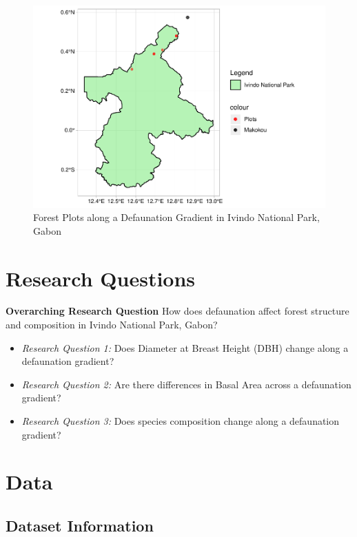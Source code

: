 \documentclass[
  12pt,
]{article}
\providecommand{\tightlist}{%
  \setlength{\itemsep}{0pt}\setlength{\parskip}{0pt}}
\begin{document}
\begin{figure}
\centering
\includegraphics{GoldenGriffithsKnierMalinowski_ENV872_Project_files/figure-latex/Map of Ivindo with plots-1.pdf}
\caption{Forest Plots along a Defaunation Gradient in Ivindo National
Park, Gabon}
\end{figure}

\hypertarget{research-questions}{%
\section{Research Questions}\label{research-questions}}

\textbf{Overarching Research Question} How does defaunation affect
forest structure and composition in Ivindo National Park, Gabon?

\begin{itemize}
\tightlist
\item
  \emph{Research Question 1:} Does Diameter at Breast Height (DBH)
  change along a defaunation gradient?
\item
  \emph{Research Question 2:} Are there differences in Basal Area across
  a defaunation gradient?
\item
  \emph{Research Question 3:} Does species composition change along a
  defaunation gradient?
\end{itemize}

\hypertarget{data}{%
\section{Data}\label{data}}

\hypertarget{dataset-information}{%
\subsection{Dataset Information}\label{dataset-information}}
\end{document}
